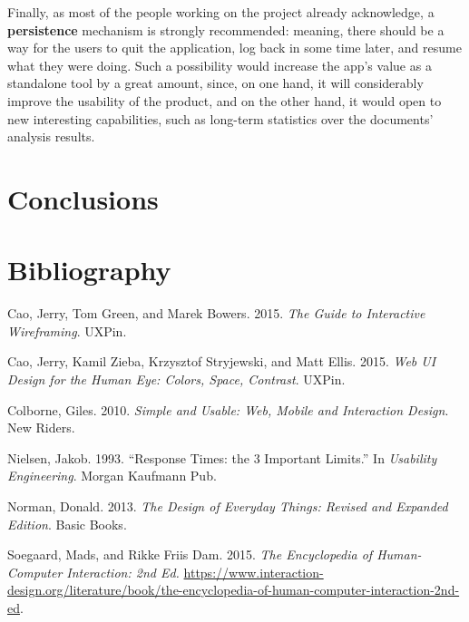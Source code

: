 \documentclass[12pt,svgnames]{memoir}
\begin{document}
Finally, as most of the people working on the project already
acknowledge, a \textbf{persistence} mechanism is strongly recommended:
meaning, there should be a way for the users to quit the application,
log back in some time later, and resume what they were doing. Such a
possibility would increase the app's value as a standalone tool by a
great amount, since, on one hand, it will considerably improve the
usability of the product, and on the other hand, it would open to new
interesting capabilities, such as long-term statistics over the
documents' analysis results.

\chapter*{Conclusions}\label{conclusions}

\chapter*{Bibliography}\label{bibliography}


Cao, Jerry, Tom Green, and Marek Bowers. 2015. \emph{The Guide to
Interactive Wireframing}. UXPin.

Cao, Jerry, Kamil Zieba, Krzysztof Stryjewski, and Matt Ellis. 2015.
\emph{Web UI Design for the Human Eye: Colors, Space, Contrast}. UXPin.

Colborne, Giles. 2010. \emph{Simple and Usable: Web, Mobile and
Interaction Design}. New Riders.

Nielsen, Jakob. 1993. ``Response Times: the 3 Important Limits.'' In
\emph{Usability Engineering}. Morgan Kaufmann Pub.

Norman, Donald. 2013. \emph{The Design of Everyday Things: Revised and
Expanded Edition}. Basic Books.

Soegaard, Mads, and Rikke Friis Dam. 2015. \emph{The Encyclopedia of
Human-Computer Interaction: 2nd Ed.}
\url{https://www.interaction-design.org/literature/book/the-encyclopedia-of-human-computer-interaction-2nd-ed}.
\end{document}
